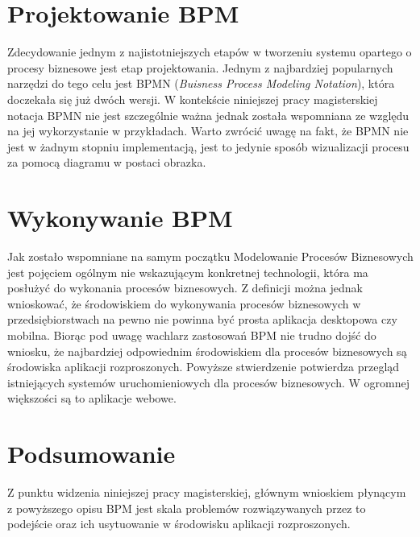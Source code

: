 
\section{Projektowanie BPM}
\label{sec:projektowanieBPM}


Zdecydowanie jednym z najistotniejszych etapów w tworzeniu systemu opartego o procesy biznesowe jest etap projektowania. Jednym z najbardziej popularnych narzędzi do tego celu jest BPMN (\textit{Buisness Process Modeling Notation}), która doczekała się już dwóch wersji. W kontekście niniejszej pracy magisterskiej notacja BPMN nie jest szczególnie ważna jednak została wspomniana ze względu na jej wykorzystanie w przykładach. Warto zwrócić uwagę  na fakt, że BPMN nie jest w żadnym stopniu implementacją, jest to jedynie sposób wizualizacji procesu za pomocą diagramu w postaci obrazka.




\section{Wykonywanie BPM}
\label{sec:wykonywanieBPM}

Jak zostało wspomniane na samym początku Modelowanie Procesów Biznesowych jest pojęciem ogólnym nie wskazującym konkretnej technologii, która ma posłużyć do wykonania procesów biznesowych. Z definicji można jednak wnioskować, że środowiskiem do wykonywania procesów biznesowych w przedsiębiorstwach na pewno nie powinna być prosta aplikacja desktopowa czy mobilna. Biorąc pod uwagę wachlarz zastosowań BPM nie trudno dojść do wniosku, że najbardziej odpowiednim środowiskiem dla procesów biznesowych są środowiska aplikacji rozproszonych. 
Powyższe stwierdzenie potwierdza przegląd istniejących systemów uruchomieniowych dla procesów biznesowych. W ogromnej większości są to aplikacje webowe. 


\section{Podsumowanie}
\label{sec:podsumowanieBPM}

Z punktu widzenia niniejszej pracy magisterskiej, głównym wnioskiem płynącym z powyższego opisu BPM jest skala problemów rozwiązywanych przez to podejście oraz ich usytuowanie w środowisku aplikacji rozproszonych. 
